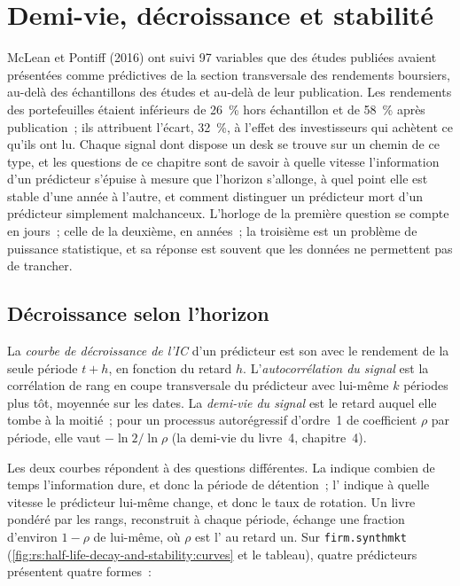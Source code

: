 \chapter{Demi-vie, décroissance et stabilité}\label{ch:rs:half-life-decay-and-stability}

McLean et Pontiff (2016) ont suivi 97 variables que des études publiées avaient présentées comme prédictives de la section transversale des rendements boursiers,
au-delà des échantillons des études et au-delà de leur publication. Les rendements des portefeuilles étaient inférieurs de 26~\% hors échantillon et de 58~\% après
publication~; ils attribuent l'écart, 32~\%, à l'effet des investisseurs qui achètent ce qu'ils ont lu. Chaque signal dont dispose un desk se trouve
sur un chemin de ce type, et les questions de ce chapitre sont de savoir à quelle vitesse l'information d'un prédicteur s'épuise à mesure que l'horizon s'allonge, à quel point
elle est stable d'une année à l'autre, et comment distinguer un prédicteur mort d'un prédicteur simplement malchanceux. L'horloge de la première question
se compte en jours~; celle de la deuxième, en années~; la troisième est un problème de puissance statistique, et sa réponse est souvent que les données ne permettent pas de trancher.

\section{Décroissance selon l'horizon}

\begin{definition}\label{def:rs:half-life-decay-and-stability:decay}
La \emph{courbe de décroissance de l'IC} d'un prédicteur est son  avec le rendement de la seule période
$t + h$, en fonction du retard $h$. L'\emph{autocorrélation du signal} est la corrélation de rang
en coupe transversale du prédicteur avec lui-même $k$ périodes plus tôt, moyennée sur les dates. La \emph{demi-vie du signal} est
le retard auquel elle tombe à la moitié~; pour un processus autorégressif d'ordre~1 de coefficient $\rho$ par période, elle vaut $-\ln 2/\ln\rho$ (la
demi-vie du livre~4, chapitre~4).
\end{definition}

Les deux courbes répondent à des questions différentes. La  indique combien de temps l'information dure, et donc la période de détention~; l' indique à quelle vitesse le prédicteur lui-même change, et donc le taux de rotation. Un livre pondéré par les rangs, reconstruit à chaque période, échange une fraction
d'environ $1 - \rho$ de lui-même, où $\rho$ est l' au retard un. Sur \texttt{firm.synthmkt}
(\cref{fig:rs:half-life-decay-and-stability:curves} et le tableau), quatre prédicteurs présentent quatre formes~:

